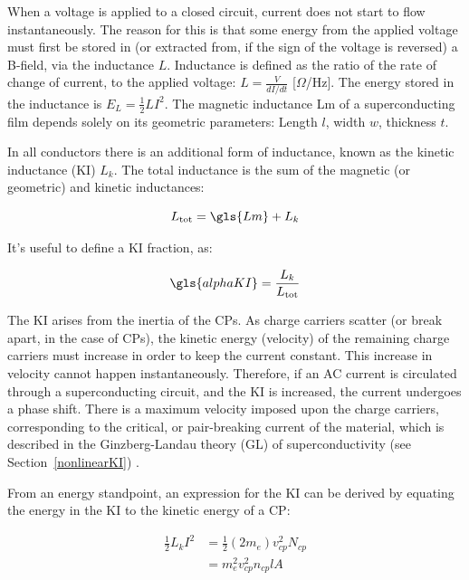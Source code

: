 When a voltage is applied to a closed circuit, current does not start to flow instantaneously. The reason for this is that some energy from the applied voltage must first be stored in (or extracted from, if the sign of the voltage is reversed) a B-field, via the inductance $L$. Inductance is defined as the ratio of the rate of change of current, to the applied voltage: $L = \frac{V}{dI/dt}$ [$\Omega$/Hz]. The energy stored in the inductance is $E_{L} = \frac{1}{2}LI^{2}$. The magnetic inductance \gls{Lm} of a superconducting film depends solely on its geometric parameters: Length $l$, width $w$, thickness $t$.

In all conductors there is an additional form of inductance, known as the kinetic inductance (KI) $L_{k}$. The total inductance is the sum of the magnetic (or geometric) and kinetic inductances:

\begin{equation}
  L_{\mathrm{tot}} = \gls{Lm} + L_{k}
\end{equation}

It's useful to define a KI fraction, as:

\begin{equation}
  \gls{alphaKI} = \frac{L_{k}}{L_{\mathrm{tot}}}
\end{equation}

The KI arises from the inertia of the CPs. As charge carriers scatter (or break apart, in the case of CPs), the kinetic energy (velocity) of the remaining charge carriers must increase in order to keep the current constant. This increase in velocity cannot happen instantaneously. Therefore, if an AC current is circulated through a superconducting circuit, and the KI is increased, the current undergoes a phase shift. There is a maximum velocity imposed upon the charge carriers, corresponding to the critical, or pair-breaking current of the material, which is described in the Ginzberg-Landau theory (GL) of superconductivity (see Section~\ref{nonlinearKI}) \citep{tinkham2004introduction}.

From an energy standpoint, an expression for the KI can be derived by equating the energy in the KI to the kinetic energy of a CP:

\begin{equation}
  \begin{aligned}
  \frac{1}{2}L_{k}I^{2} &= \frac{1}{2}(2m_{e})v_{cp}^{2}N_{cp}\\
                        &= m_{e}^{2}v_{cp}^{2}n_{cp}lA
  \end{aligned}
\end{equation}

